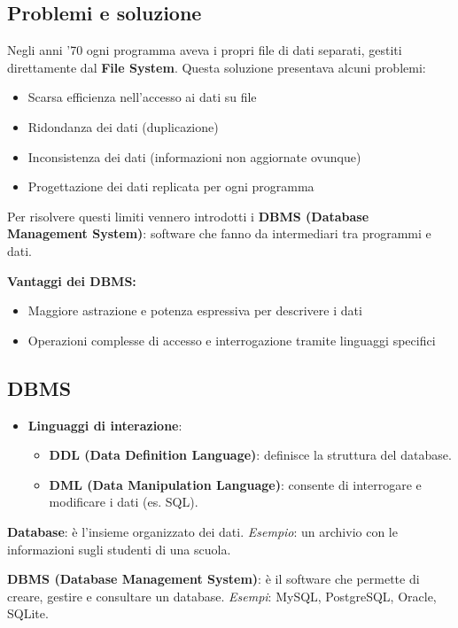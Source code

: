 \subsection{Problemi e soluzione}

Negli anni ’70 ogni programma aveva i propri file di dati separati, gestiti direttamente dal \textbf{File System}.  
Questa soluzione presentava alcuni problemi:
\begin{itemize}
    \item Scarsa efficienza nell’accesso ai dati su file
    \item Ridondanza dei dati (duplicazione)
    \item Inconsistenza dei dati (informazioni non aggiornate ovunque)
    \item Progettazione dei dati replicata per ogni programma
\end{itemize}

\noindent
Per risolvere questi limiti vennero introdotti i \textbf{DBMS (Database Management System)}: software che fanno da intermediari tra programmi e dati.

\textbf{Vantaggi dei DBMS:}
\begin{itemize}
    \item Maggiore astrazione e potenza espressiva per descrivere i dati
    \item Operazioni complesse di accesso e interrogazione tramite linguaggi specifici
\end{itemize}

\subsection{DBMS}

\begin{itemize}
    \item \textbf{Linguaggi di interazione}:
    \begin{itemize}
        \item \textbf{DDL (Data Definition Language)}: definisce la struttura del database.
        \item \textbf{DML (Data Manipulation Language)}: consente di interrogare e modificare i dati (es. SQL).
    \end{itemize}
\end{itemize}

\begin{tcolorbox}[colback=yellow!20!white, colframe=black, title=Differenza tra Database e DBMS]
\textbf{Database}: è l’insieme organizzato dei dati.  
\emph{Esempio}: un archivio con le informazioni sugli studenti di una scuola.  

\textbf{DBMS (Database Management System)}: è il software che permette di creare, gestire e consultare un database.  
\emph{Esempi}: MySQL, PostgreSQL, Oracle, SQLite.
\end{tcolorbox}

